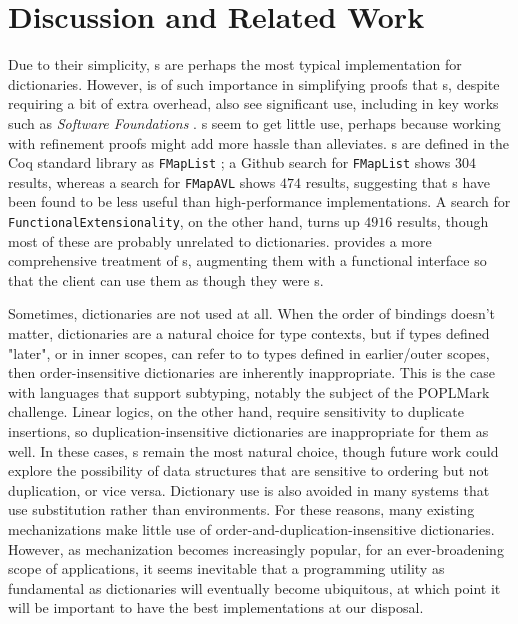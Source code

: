 \section{Discussion and Related Work}
\label{sec:Discussion}

Due to their simplicity, {\SAL}s are perhaps the most typical implementation for dictionaries.
%
However, \SemInj{} is of such importance in simplifying proofs that {\FPF}s, despite requiring a bit of extra overhead, also see significant use,
%
including in key works such as \emph{Software Foundations} \cite[Maps]{Pierce:SF1}.
%
{\CAL}s seem to get little use, perhaps because working with refinement proofs might add more hassle than \SemInj{} alleviates.
%
{\CAL}s are defined in the Coq standard library as \texttt{FMapList} \citep{XXX,XXX,XXX}; a Github search for \texttt{FMapList} shows $304$ results,
%
whereas a search for \texttt{FMapAVL} shows $474$ results, suggesting that {\CAL}s have been found to be less useful than high-performance implementations.
%
A search for \texttt{FunctionalExtensionality}, on the other hand, turns up $4916$ results, though most of these are probably unrelated to dictionaries.
%
\citep{XXX,XXX,XXX}  provides a more comprehensive treatment of {\CAL}s, augmenting them with a functional interface so that the client can
%
use them as though they were {\FPF}s.


Sometimes, dictionaries are not used at all. When the order of bindings doesn't matter, dictionaries are a natural choice for type contexts,
%
but if types defined "later", or in inner scopes, can refer to to types defined in earlier/outer scopes, then order-insensitive dictionaries
%
are inherently inappropriate. This is the case with languages that support subtyping, notably the subject of the POPLMark challenge. Linear logics, on the other hand,
%
require sensitivity to duplicate insertions, so duplication-insensitive dictionaries are inappropriate for them as well. In these cases, {\SAL}s remain the most
%
natural choice, though future work could explore the possibility of data structures that are sensitive to ordering but not duplication, or vice versa.
%
Dictionary use is also avoided in many systems that use substitution rather than environments. For these reasons, many existing mechanizations make little use of
%
order-and-duplication-insensitive dictionaries. However, as mechanization becomes increasingly popular, for an ever-broadening scope of applications,
%
it seems inevitable that a programming utility as fundamental as dictionaries will eventually become ubiquitous, at which point it will be important to have the
%
best implementations at our disposal.


